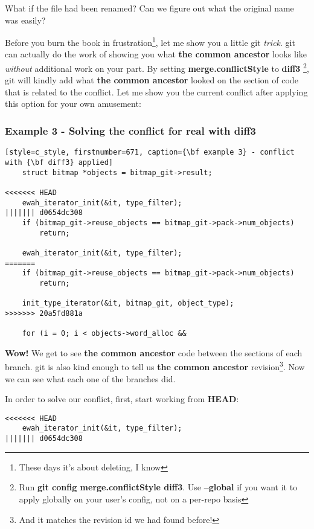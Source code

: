 What if the file had been renamed? Can we figure out what the original name was easily?

Before you burn the book in frustration\footnote{These days it's about deleting, I know}, let me show you a little git
{\it trick}. git can actually do the work of showing you what {\bf the common ancestor} looks like {\it without } additional
work on your part. By setting {\bf merge.conflictStyle} to {\bf diff3} \footnote{ Run {\bf git config merge.conflictStyle diff3}.
Use {\bf --global} if you want it to apply globally on your user's config, not on a per-repo basis}, git will kindly add what
{\bf the common ancestor} looked on the section of code that is related to the conflict. Let me show you the current conflict
after applying this option for your own amusement:

\subsubsection{Example 3 - Solving the conflict for real with {\bf diff3}}
\begin{lstlisting}[style=c_style, firstnumber=671, caption={\bf example 3} - conflict with {\bf diff3} applied]
	struct bitmap *objects = bitmap_git->result;

<<<<<<< HEAD
	ewah_iterator_init(&it, type_filter);
||||||| d0654dc308
	if (bitmap_git->reuse_objects == bitmap_git->pack->num_objects)
		return;

	ewah_iterator_init(&it, type_filter);
=======
	if (bitmap_git->reuse_objects == bitmap_git->pack->num_objects)
		return;

	init_type_iterator(&it, bitmap_git, object_type);
>>>>>>> 20a5fd881a

	for (i = 0; i < objects->word_alloc &&
\end{lstlisting}

{\bf Wow!} We get to see {\bf the common ancestor} code between the sections of each branch. git is also kind enough to tell us
{\bf the common ancestor} revision\footnote{And it matches the revision id we had found before!}. Now we can see what each one
of the branches did.

In order to solve our conflict, first, start working from {\bf HEAD}:
\begin{lstlisting}[style=c_style, firstnumber=673, caption={\bf example 3} - step 1]
<<<<<<< HEAD
	ewah_iterator_init(&it, type_filter);
||||||| d0654dc308
\end{lstlisting}

